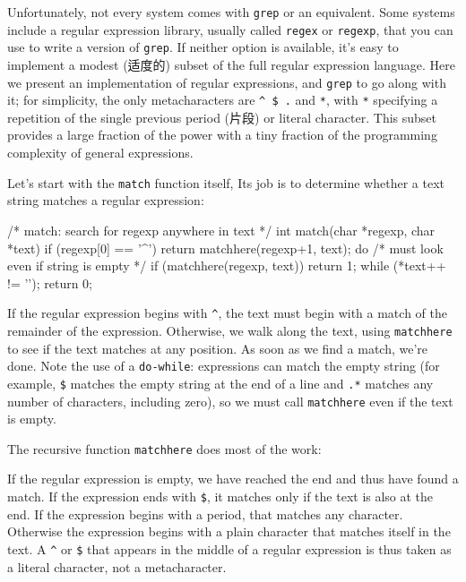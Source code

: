 Unfortunately, not every system comes with \verb'grep' or an equivalent.
Some systems include a regular expression library, usually called
\verb'regex' or \verb'regexp', that you can use to write a version of
\verb'grep'. If neither option is available, it's easy to implement a
modest (适度的) subset of the full regular expression language. Here we
present an implementation of regular expressions, and \verb'grep' to go
along with it; for simplicity, the only metacharacters are \verb'^ $ .' and
\verb'*', with \verb'*' specifying a repetition of the single previous
period (片段) or literal character. This subset provides a large fraction
of the power with a tiny fraction of the programming complexity of general
expressions.

Let's start with the \verb'match' function itself, Its job is to determine
whether a text string matches a regular expression:
\begin{wellcode}
    /* match: search for regexp anywhere in text */
    int match(char *regexp, char *text)
    {
        if (regexp[0] == '^')
            return matchhere(regexp+1, text);
        do {    /* must look even if string is empty */
            if (matchhere(regexp, text))
                return 1;
        } while (*text++ != '\0');
        return 0;
    }
\end{wellcode}
If the regular expression begins with \verb'^', the text must begin with a
match of the remainder of the expression. Otherwise, we walk along the
text, using \verb'matchhere' to see if the text matches at any position. As
soon as we find a match, we're done. Note the use of a \verb'do-while':
expressions can match the empty string (for example, \verb'$' matches the
empty string at the end of a line and \verb'.*' matches any number of
characters, including zero), so we must call \verb'matchhere' even if the
text is empty.

The recursive function \verb'matchhere' does most of the work:
If the regular expression is empty, we have reached the end and thus have
found a match. If the expression ends with \verb'$', it matches only if the
text is also at the end. If the expression begins with a period, that
matches any character. Otherwise the expression begins with a plain
character that matches itself in the text. A \verb'^' or \verb'$' that
appears in the middle of a regular expression is thus taken as a literal
character, not a metacharacter.

